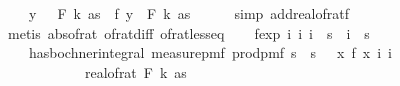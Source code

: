 \begin{isabellebody}
\ \ \ \ {\isacharbraceleft}{\kern0pt}y{\isachardot}{\kern0pt}\ {\isacharparenleft}{\kern0pt}{\isasymdelta}\ {\isacharasterisk}{\kern0pt}\ F\ k\ as{\isacharparenright}{\kern0pt}\ {\isasymge}\ {\isasymbar}f\ y\ {\isacharminus}{\kern0pt}\ {\isacharparenleft}{\kern0pt}F\ k\ as{\isacharparenright}{\kern0pt}{\isasymbar}{\isacharbraceright}{\kern0pt}{\isachardoublequoteclose}\isanewline
\ \ \ \ \isamarkupfalse%
\ {\isacharparenleft}{\kern0pt}simp\ add{\isacharcolon}{\kern0pt}real{\isacharunderscore}{\kern0pt}of{\isacharunderscore}{\kern0pt}rat{\isacharunderscore}{\kern0pt}f{\isacharparenright}{\kern0pt}\isanewline
\ \ \ \ \isamarkupfalse%
\ {\isacharparenleft}{\kern0pt}metis\ abs{\isacharunderscore}{\kern0pt}of{\isacharunderscore}{\kern0pt}rat\ of{\isacharunderscore}{\kern0pt}rat{\isacharunderscore}{\kern0pt}diff\ of{\isacharunderscore}{\kern0pt}rat{\isacharunderscore}{\kern0pt}less{\isacharunderscore}{\kern0pt}eq{\isacharparenright}{\kern0pt}\isanewline
\isanewline
\ \ \isamarkupfalse%
\ f{}{\isacharunderscore}{\kern0pt}exp{\isacharcolon}{\kern0pt}\ {\isachardoublequoteopen}{\isasymAnd}i\ i\ i\ {\isacharless}{\kern0pt}\ s\ {\isasymLongrightarrow}\ i\ {\isacharless}{\kern0pt}\ s\ {\isasymLongrightarrow}\ \isanewline
\ \ \ \ has{\isacharunderscore}{\kern0pt}bochner{\isacharunderscore}{\kern0pt}integral\ {\isacharparenleft}{\kern0pt}measure{\isacharunderscore}{\kern0pt}pmf\ {\isacharparenleft}{\kern0pt}prod{\isacharunderscore}{\kern0pt}pmf\ {\isacharparenleft}{\kern0pt}{\isacharbraceleft}{\kern0pt}{}{\isachardot}{\kern0pt}{\isachardot}{\kern0pt}{\isacharless}{\kern0pt}s\ {\isasymtimes}\ {\isacharbraceleft}{\kern0pt}{}{\isachardot}{\kern0pt}{\isachardot}{\kern0pt}{\isacharless}{\kern0pt}s\ {\isacharparenleft}{\kern0pt}{\isasymlambda}{\isacharunderscore}{\kern0pt}{\isachardot}{\kern0pt}\ {\isasymOmega}{\isacharparenright}{\kern0pt}{\isacharparenright}{\kern0pt}{\isacharparenright}{\kern0pt}\ {\isacharparenleft}{\kern0pt}{\isasymlambda}x{\isachardot}{\kern0pt}\ f{}\ x\ i\ i\isanewline
\ \ \ \ \ \ \ \ \ \ \ \ {\isacharparenleft}{\kern0pt}real{\isacharunderscore}{\kern0pt}of{\isacharunderscore}{\kern0pt}rat\ {\isacharparenleft}{\kern0pt}F\ k\ as{\isacharparenright}{\kern0pt}{\isacharparenright}{\kern0pt}{\isachardoublequoteclose}\isanewline

\end{isabellebody}
